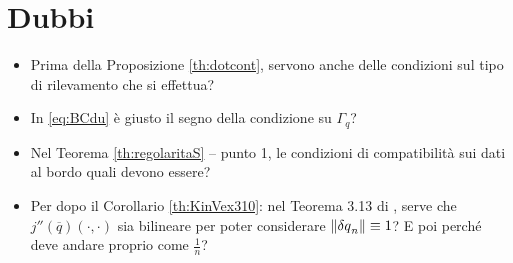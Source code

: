 \newpage
\section{Dubbi}
\begin{itemize}
\item
	Prima della Proposizione \ref{th:dotcont}, servono anche delle condizioni sul tipo di rilevamento che si effettua?
\item
	In \eqref{eq:BCdu} è giusto il segno della condizione su $\Gamma_q$?
\item
	Nel Teorema \ref{th:regolaritaS} -- punto 1, le condizioni di compatibilità sui dati al bordo quali devono essere?
\item
	Per dopo il Corollario \ref{th:KinVex310}: nel Teorema 3.13 di \cite{Kinigera}, serve che $j''(\overline{q})(\cdot,\cdot)$ sia bilineare per poter considerare $\|{\delta q}_n\|\equiv1$? E poi perché deve andare proprio come $\frac{1}{n}$?
\end{itemize}